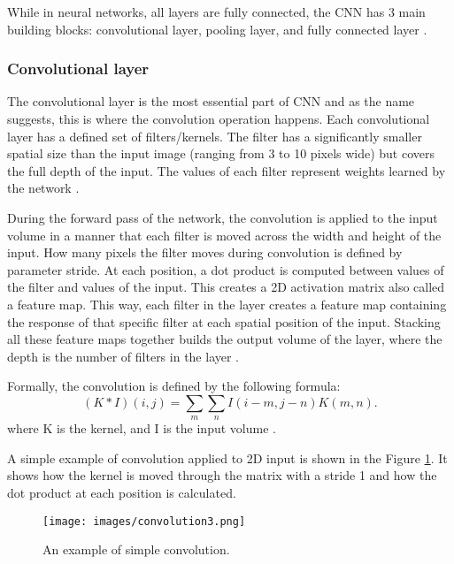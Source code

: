 
While in neural networks, all layers are fully connected, the CNN has 3 main building blocks: convolutional layer, pooling layer, and fully connected layer \cite{standford}.

\subsubsection{Convolutional layer}

The convolutional layer is the most essential part of CNN and as the name suggests, this is where the convolution operation happens. Each convolutional layer has a defined set of filters/kernels. The filter has a significantly smaller spatial size than the input image (ranging from 3 to 10 pixels wide) but covers the full depth of the input. The values of each filter represent weights learned by the network \cite{standford}.

During the forward pass of the network, the convolution is applied to the input volume in a manner that each filter is moved across the width and height of the input. How many pixels the filter moves during convolution is defined by parameter stride. At each position, a dot product is computed between values of the filter and values of the input. This creates a 2D activation matrix also called a feature map. 
This way, each filter in the layer creates a feature map containing the response of that specific filter at each spatial position of the input. Stacking all these feature maps together builds the output volume of the layer, where the depth is the number of filters in the layer \cite{Goodfellow-et-al-2016} \cite{standford}.

Formally, the convolution is defined by the following formula:
\begin{equation}
    (K * I) (i,j) = \displaystyle\sum_{m}  \displaystyle\sum_{n} I(i - m, j - n) K(m, n).
\end{equation}
where K is the kernel, and I is the input volume \cite{Goodfellow-et-al-2016}.

A simple example of convolution applied to 2D input is shown in the Figure \ref{img:conv0}. It shows how the kernel is moved through the matrix with a stride 1 and how the dot product at each position is calculated. 

\begin{figure}[h]
    \centering
    \texttt{[image: images/convolution3.png]}
    \caption{An example of simple convolution.}
    \label{img:conv0}
\end{figure}


